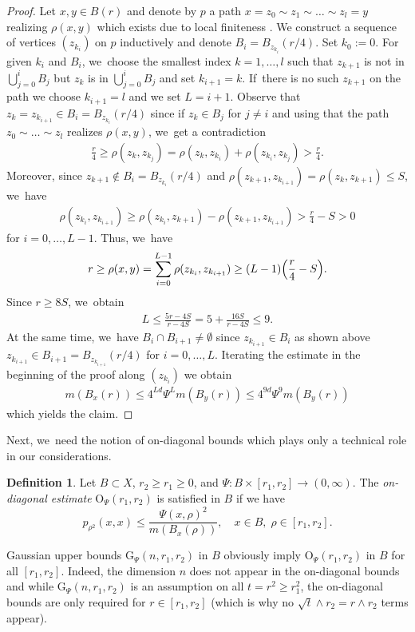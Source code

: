 \documentclass[10pt]{amsart}
\newcommand{\rG}{\mathrm{G}}
\newcommand{\rO}{\mathrm{O}}
\theoremstyle{plain}
\theoremstyle{definition}
\newtheorem{definition}[theorem]{Definition}
\begin{document}
\begin{proof}
Let $x,y\in B(r)$ and
denote by $p$ a path $x=z_0\sim z_1\sim \ldots \sim z_l= y$ realizing $\rho(x,y)$ which exists due to local finiteness \cf \cite[Ch.\,12.2]{KellerLW-21}. We construct a sequence of vertices $ (z_{k_i}) $ on $ p $ inductively and denote $ B_{i}=B_{z_{k_{i}}}(r/4) $. Set $k_0:=0$. For given $ k_{i} $ and $ B_{i} $, we~choose the smallest index $ k =1,\ldots,l$ such that $ z_{k+1} $ is not in $\bigcup_{j=0}^{i} B_{j} $ but $ z_{k} $ is in $\bigcup_{j=0}^{i} B_{j} $ and set $ k_{i+1}={k} $. If~there is no such $ z_{k+1} $ on the path we choose $ k_{i+1}=l $ and we set $ L=i+1 $. {Observe that $ z_{k}=z_{k_{i+1}}\in B_{i}=B_{z_{k_{i}}}(r/4) $ since if $ z_{k}\in B_{j} $ for $ j\neq i $ and using that the path $ z_0\sim\ldots\sim z_{l} $ realizes $ \rho(x,y) $, we~get a contradiction
\begin{align*}
\frac{r}{4}\ge \rho(z_{k},z_{k_{j}})= \rho(z_{k},z_{k_{i}})+ \rho(z_{k_{i}},z_{k_{j}})>\frac{r}{4}.
\end{align*}
}Moreover, since $ z_{k+1}\not\in B_{i}= B_{z_{k_{i}}}(r/4) $ and {$ \rho(z_{k+1},z_{k_{i+1}})=\rho(z_{k},z_{k+1})\leq S $, we~have
\begin{align*}
\rho ( z_{k_i}, z_{k_{i+1}})\ge \rho(z_{k_{i}},z_{k+1})-\rho(z_{k+1},z_{k_{i+1}})>\frac{r}{4}-S > 0
\end{align*}}
for $ i=0,\ldots,L-1 $. Thus, we~have
\begin{align*}
r\ge \rho(x,y)=\sum_{i=0}^{L-1}\rho(z_{k_{i}},z_{k_{i+1}}) \ge (L-1)\Bigl(\frac{r}{4}-S\Bigr).
\end{align*}
Since $ r\ge 8S $, we~obtain
\begin{align*}
L\le \frac{5r-4S}{r-4S}= 5 + \frac{16S}{r-4S}\leq 9.
\end{align*}
At the same time, we~have
$ B_{i}\cap B_{i+1} \neq \emptyset$ since {$ z_{k_{i+1}}\in B_{i}$ as shown above $z_{k_{i+1}}\in B_{i+1}=B_{z_{k_{i+1}}}(r/4) $} for $ i=0,\ldots, L $.
Iterating the estimate in the beginning of the proof along $ (z_{k_{i}}) $ we obtain
\begin{align*}
m(B_{x}(r))\leq 4^{Ld}\Psi^{L}m(B_{y}(r))\leq 4^{9d}\Psi^{9}m(B_{y}(r))
\end{align*}
which yields the claim.
\end{proof}

Next, we~need the notion of on-diagonal bounds which plays only a technical role in our considerations.

\begin{definition} Let $B\subset X$, $ r_{2}\ge r_{1}\ge 0 $, and $\Psi\colon B\times [r_1,r_2]\to (0,\infty)$. The \emph{on-diagonal estimate} $\rO_{\Psi}(r_1,r_2)$ is satisfied in $B$ if we have
\[
p_{\rho^2}(x,x)\leq \frac{\Psi(x,\rho)^2}{m(B_x(\rho))},\quad x\in B,\; \rho\in[r_1,r_2].
\]
\end{definition}
Gaussian upper bounds $\rG_\Psi(n,r_1,r_2)$ in $B$ obviously imply $\rO_\Psi(r_1,r_2)$ in $B$ for all $[r_1,r_2]$. Indeed, the dimension $ n $ does not appear in the on-diagonal bounds and while $\rG_\Psi(n,r_1,r_2) $ is an assumption on all $ t=r^{2}\ge r_{1} ^{2}$, the on-diagonal bounds are only required for $ r \in[r_{1},r_{2}]$ (which is why no $ \sqrt{t}\wedge r_{2}=r\wedge r_{2} $ terms appear).
\end{document}
